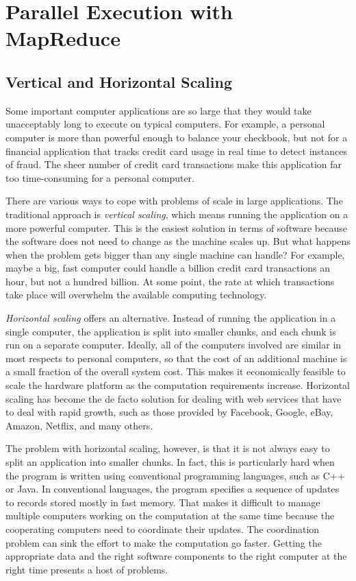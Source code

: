 \chapter{Parallel Execution with MapReduce}

\section{Vertical and Horizontal Scaling}

Some important computer applications are so large that they would take
unacceptably long to execute on typical computers.  For
example, a personal computer is more than powerful enough
to balance your checkbook, but not for a financial
application that tracks credit card usage in real time to
detect instances of fraud.  The sheer number of credit card
transactions make this application far too time-consuming for a
personal computer.

There are various ways to cope 
with problems of scale  in large applications.  
The traditional approach is
\emph{vertical scaling}, 
which means running the
application on a more powerful computer.
This is the easiest solution in terms of software
because the software does not need to change as the machine scales up.
But what happens when the problem gets bigger than any single machine can handle?
For example, maybe a big, fast computer could handle
a billion credit card transactions an hour,
but not a hundred billion.
At some point, the rate at which transactions take place
will overwhelm the available computing technology.

\emph{Horizontal scaling}
offers an alternative.  Instead of
running the application in a single computer,
the application is split into smaller
chunks, and each chunk is run on a separate computer.
Ideally, all of the computers involved are similar in most respects
to personal computers, so that the cost of an additional
machine is a small fraction of the overall system cost.
This makes it economically feasible to scale the
hardware platform as the computation requirements increase.
Horizontal scaling has become the de facto
solution for dealing with web services that have to deal
with rapid growth, such as those provided by 
Facebook, Google, eBay, Amazon, Netflix, and many others.

The problem with horizontal scaling, however, is that it is
not always easy to split an application into smaller
chunks.  In fact, this is particularly hard when the program
is written using conventional programming languages, such as
C++ or Java. In conventional languages, the program specifies
a sequence of updates to records stored mostly in fast memory.
That makes it difficult to manage multiple computers 
working on the computation at the same time because the
cooperating computers need to coordinate their updates.
The coordination problem can sink the effort to make
the computation go faster.
Getting the appropriate data and the right software 
components to the right computer
at the right time presents a host of problems.

